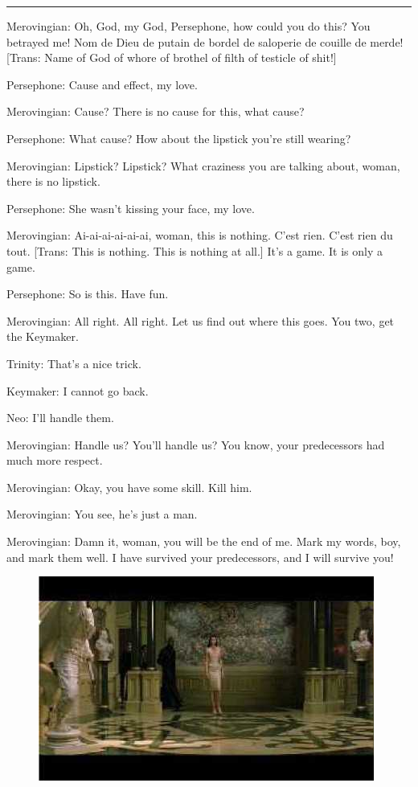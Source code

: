 \documentclass{ctexart}
\newcommand{\myparsep}{\noindent \rule[0.5ex]{\linewidth}{1pt}}
\newenvironment{myquote}{\color{green} \setlength{\leftskip}{6em} \setlength{\rightskip}{4em} \setlength{\parindent}{-2em}}{\par}
\begin{document}
\myparsep

\begin{myquote}
Merovingian: Oh, God, my God, Persephone, how could you do this? You betrayed me! Nom de Dieu de putain de bordel de saloperie de couille de merde! [Trans: Name of God of whore of brothel of filth of testicle of shit!]

Persephone: Cause and effect, my love.

Merovingian: Cause? There is no cause for this, what cause?

Persephone: What cause? How about the lipstick you're still wearing?

Merovingian: Lipstick? Lipstick? What craziness you are talking about, woman, there is no lipstick.

Persephone: She wasn't kissing your face, my love.

Merovingian: Ai-ai-ai-ai-ai-ai, woman, this is nothing. C'est rien. C'est rien du tout. [Trans: This is nothing. This is nothing at all.] It's a game. It is only a game.

Persephone: So is this. Have fun.

Merovingian: All right. All right. Let us find out where this goes. You two, get the Keymaker.

Trinity: That's a nice trick.

Keymaker: I cannot go back.

Neo: I'll handle them.

Merovingian: Handle us? You'll handle us? You know, your predecessors had much more respect.

Merovingian: Okay, you have some skill. Kill him.

Merovingian: You see, he's just a man.

Merovingian: Damn it, woman, you will be the end of me. Mark my words, boy, and mark them well. I have survived your predecessors, and I will survive you!
\end{myquote}

\begin{figure}[htb]
\centering
\includegraphics[width=0.5\linewidth]{fig/read_reloaded-116}
\end{figure}
\end{document}
